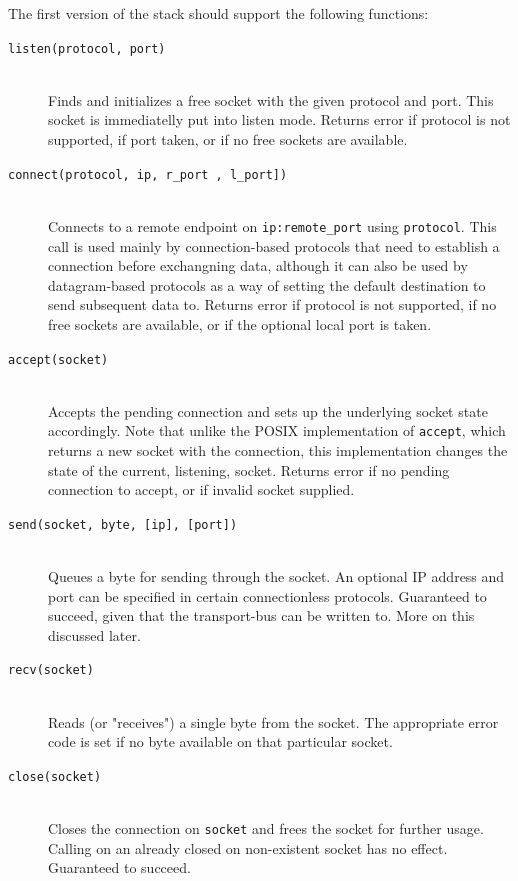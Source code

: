 The first version of the stack should support the following functions:
\begin{description}
\item[\texttt{listen(protocol, port)}]\hfill\\
    Finds and initializes a free socket with the given protocol and port. This
    socket is immediatelly put into listen mode.
    Returns error if protocol is not supported, if port taken, or if no free sockets
    are available.
\item[\texttt{connect(protocol, ip, r\_port , l\_port])}]\hfill\\
    Connects to a remote endpoint on \texttt{ip:remote\_port} using \texttt{protocol}.
    This call is used mainly by connection-based protocols that need to
    establish a connection before exchangning data, although it can also be used
    by datagram-based protocols as a way of setting the default destination to
    send subsequent data to.
    Returns error if protocol is not supported, if no free sockets are available,
    or if the optional local port is taken.

\item[\texttt{accept(socket)}]\hfill\\
    Accepts the pending connection and sets up the underlying socket state
    accordingly. Note that unlike the POSIX implementation of \texttt{accept},
    which returns a new socket with the connection, this implementation changes
    the state of the current, listening, socket.
    Returns error if no pending connection to accept, or if invalid socket
    supplied.

\item[\texttt{send(socket, byte, [ip], [port])}]\hfill\\
    Queues a byte for sending through the socket. An optional IP address and
    port can be specified in certain connectionless protocols.
    Guaranteed to succeed, given that the transport-bus can be written to. More
    on this discussed later.
\item[\texttt{recv(socket)}]\hfill\\
    Reads (or "receives") a single byte from the socket. The appropriate error
    code is set if no byte available on that particular socket.

\item[\texttt{close(socket)}]\hfill\\
    Closes the connection on \texttt{socket} and frees the socket for further
    usage. Calling on an already closed on non-existent socket has no effect.
    Guaranteed to succeed.

\end{description}

